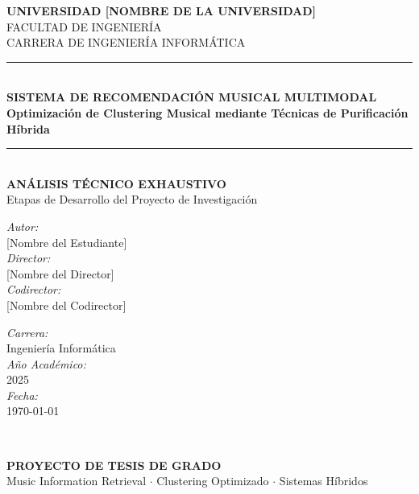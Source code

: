 \documentclass[12pt,a4paper]{report}
\begin{document}
\begin{titlepage}
\centering

\vspace*{2cm}

{\LARGE \textbf{UNIVERSIDAD [NOMBRE DE LA UNIVERSIDAD]}}\\[0.5cm]
{\Large FACULTAD DE INGENIERÍA}\\[0.5cm]
{\Large CARRERA DE INGENIERÍA INFORMÁTICA}\\[2cm]

\rule{\linewidth}{0.2mm}\\[0.4cm]
{\huge \textbf{SISTEMA DE RECOMENDACIÓN MUSICAL MULTIMODAL}}\\[0.2cm]
{\Large \textbf{Optimización de Clustering Musical mediante Técnicas de Purificación Híbrida}}\\[0.4cm]
\rule{\linewidth}{0.2mm}\\[1.5cm]

{\Large \textbf{ANÁLISIS TÉCNICO EXHAUSTIVO}}\\[0.5cm]
{\large Etapas de Desarrollo del Proyecto de Investigación}\\[2cm]

\begin{minipage}{0.4\textwidth}
\begin{flushleft} \large
\emph{Autor:}\\
{[Nombre del Estudiante]}\\[0.3cm]
\emph{Director:}\\
{[Nombre del Director]}\\[0.3cm]
\emph{Codirector:}\\
{[Nombre del Codirector]}
\end{flushleft}
\end{minipage}
\begin{minipage}{0.4\textwidth}
\begin{flushright} \large
\emph{Carrera:} \\
Ingeniería Informática\\[0.3cm]
\emph{Año Académico:} \\
2025\\[0.3cm]
\emph{Fecha:} \\
\today
\end{flushright}
\end{minipage}\\[2cm]

\vfill

{\large \textbf{PROYECTO DE TESIS DE GRADO}}\\[0.5cm]
{\normalsize Music Information Retrieval $\cdot$ Clustering Optimizado $\cdot$ Sistemas Híbridos}

\end{titlepage}
\end{document}
